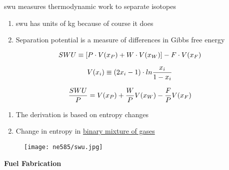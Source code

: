 \documentclass[aspectratio=1610,pdftex,dvipsnames,compress,xcolor={dvipsnames}]{beamer}
\newcommand{\acs}{\acrshort} %
\begin{document}
\begin{frame}{\acs{swu} measures thermodynamic work to separate isotopes}
    \begin{enumerate}[series=outerlist,topsep=0pt,itemsep=11pt,leftmargin=*,label=(\arabic*)]
        \item[]\acs{swu} has units of kg because of course it does
        \item[]Separation potential is a measure of differences in Gibbs free energy
    \end{enumerate}

    \vspace*{\fill}

    \begin{equation}
        \LARGE
        SWU \equiv [P \cdot V(x_P)+W \cdot V(x_W)]-F \cdot V(x_F)
    \end{equation}

    \begin{equation}
        \LARGE 
        V(x_i) \equiv (2x_i - 1) \cdot ln \frac{x_i}{1-x_i}
    \end{equation}
    
    \begin{equation}
        \LARGE 
        \frac{SWU}{P} = V(x_P) + \frac{W}{P}V(x_W) - \frac{F}{P}V(x_F)
    \end{equation}
    
    \vspace*{\fill}

    \begin{enumerate}[series=outerlist,topsep=0pt,itemsep=11pt,leftmargin=*,label=(\arabic*)]
        \item[]The derivation is based on entropy changes
        \item[]Change in entropy in \href{https://drive.google.com/file/d/0B1ENwqH9aCq5UnZ4NHNCdHZfN1U/view?resourcekey=0-WXKzU2rJK0q2qVPJcDhutQ}{binary mixture of gases}
    \end{enumerate}
\end{frame}


\begin{frame}{}
    \begin{figure}
        \centering
        \texttt{[image: ne585/swu.jpg]}
    \end{figure}
\end{frame}


\begin{frame}[plain]{}
    \centering\LARGE\textbf{Fuel Fabrication}
\end{frame}
\end{document}
